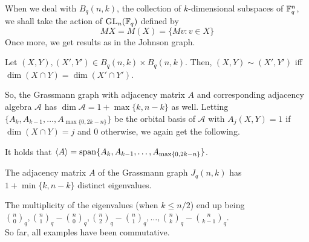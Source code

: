 	When we deal with $B_q(n,k)$, the collection of $k$-dimensional subspaces of $\mathbb{F}_q^n$, we shall take the action of $\operatorname{GL}_n(\mathbb{F}_q)$ defined by
	\[ MX = M(X) = \{Mv : v \in X\} \]
	Once more, we get results as in the Johnson graph.

	\begin{flem}
		Let $(X,Y), (X',Y') \in B_q(n,k) \times B_q(n,k)$. Then, $(X,Y) \sim (X',Y')$ iff $\dim(X \cap Y) = \dim(X' \cap Y')$.
	\end{flem}
	So, the Grassmann graph with adjacency matrix $A$ and corresponding adjacency algebra $\mathcal{A}$ has $\dim \mathcal{A} = 1+\max\{k,n-k\}$ as well. Letting $\{A_k,A_{k-1},\ldots,A_{\max\{0,2k-n\}}\}$ be the orbital basis of $\mathcal{A}$ with $A_j(X,Y) = 1$ if $\dim(X \cap Y) = j$ and $0$ otherwise, we again get the following.

	\begin{fprop}
		\label{prop: johnson-adj-eigenvals}
		It holds that $\langle A\rangle = \operatorname{span}\{A_k,A_{k-1},\ldots,A_{\max\{0,2k-n\}}\}$.
	\end{fprop}

	\begin{fcor}
	 	The adjacency matrix $A$ of the Grassmann graph $J_q(n,k)$ has $1+\min\{k,n-k\}$ distinct eigenvalues. 
	 \end{fcor}
	 
	 The multiplicity of the eigenvalues (when $k \le n/2$) end up being $\binom{n}{0}_q, \binom{n}{1}_q-\binom{n}{0}_q, \binom{n}{2}_q-\binom{n}{1}_q, \ldots, \binom{n}{k}_q-\binom{n}{k-1}_q$.\\

	 So far, all examples have been commutative.

